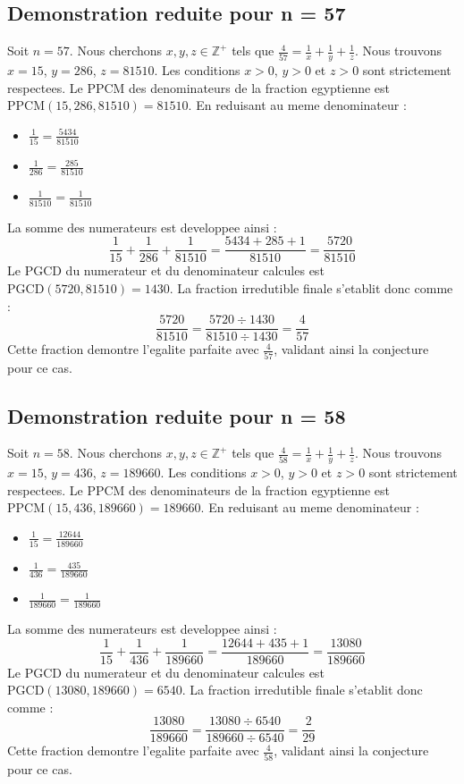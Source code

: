 \documentclass[11pt,a4paper]{article}
\begin{document}
\subsection{Demonstration reduite pour n = 57}
Soit $n = 57$. Nous cherchons $x, y, z \in \mathbb{Z}^{+}$ tels que $\frac{4}{57} = \frac{1}{x} + \frac{1}{y} + \frac{1}{z}$.
Nous trouvons $x = 15$, $y = 286$, $z = 81510$.
Les conditions $x > 0$, $y > 0$ et $z > 0$ sont strictement respectees.
Le PPCM des denominateurs de la fraction egyptienne est $\text{PPCM}(15, 286, 81510) = 81510$.
En reduisant au meme denominateur :
\begin{itemize}
    \item $\frac{1}{15} = \frac{5434}{81510}$
    \item $\frac{1}{286} = \frac{285}{81510}$
    \item $\frac{1}{81510} = \frac{1}{81510}$
\end{itemize}
La somme des numerateurs est developpee ainsi :
$$ \frac{1}{15} + \frac{1}{286} + \frac{1}{81510} = \frac{5434 + 285 + 1}{81510} = \frac{5720}{81510} $$
Le PGCD du numerateur et du denominateur calcules est $\text{PGCD}(5720, 81510) = 1430$.
La fraction irredutible finale s'etablit donc comme :
$$ \frac{5720}{81510} = \frac{5720 \div 1430}{81510 \div 1430} = \frac{4}{57} $$
Cette fraction demontre l'egalite parfaite avec $\frac{4}{57}$, validant ainsi la conjecture pour ce cas.

\subsection{Demonstration reduite pour n = 58}
Soit $n = 58$. Nous cherchons $x, y, z \in \mathbb{Z}^{+}$ tels que $\frac{4}{58} = \frac{1}{x} + \frac{1}{y} + \frac{1}{z}$.
Nous trouvons $x = 15$, $y = 436$, $z = 189660$.
Les conditions $x > 0$, $y > 0$ et $z > 0$ sont strictement respectees.
Le PPCM des denominateurs de la fraction egyptienne est $\text{PPCM}(15, 436, 189660) = 189660$.
En reduisant au meme denominateur :
\begin{itemize}
    \item $\frac{1}{15} = \frac{12644}{189660}$
    \item $\frac{1}{436} = \frac{435}{189660}$
    \item $\frac{1}{189660} = \frac{1}{189660}$
\end{itemize}
La somme des numerateurs est developpee ainsi :
$$ \frac{1}{15} + \frac{1}{436} + \frac{1}{189660} = \frac{12644 + 435 + 1}{189660} = \frac{13080}{189660} $$
Le PGCD du numerateur et du denominateur calcules est $\text{PGCD}(13080, 189660) = 6540$.
La fraction irredutible finale s'etablit donc comme :
$$ \frac{13080}{189660} = \frac{13080 \div 6540}{189660 \div 6540} = \frac{2}{29} $$
Cette fraction demontre l'egalite parfaite avec $\frac{4}{58}$, validant ainsi la conjecture pour ce cas.
\end{document}

